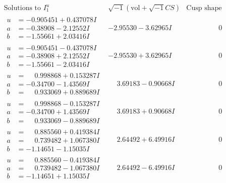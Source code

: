 \documentclass[1p]{elsarticle_modified}
\theoremstyle{definition}
\newcommand{\I}{\sqrt{-1}}
\begin{document}
$$\begin{array}{c|c|c}  
\text{Solutions to }I^u_{1}& \I (\text{vol} + \sqrt{-1}CS) & \text{Cusp shape}\\
 \hline 
\begin{aligned}
u &= -0.905451 + 0.437078 I \\
a &= -0.38908 - 2.12552 I \\
b &= -1.55661 + 2.03416 I\end{aligned}
 & -2.95530 - 3.62965 I & \phantom{-0.000000 } 0 \\ \hline\begin{aligned}
u &= -0.905451 - 0.437078 I \\
a &= -0.38908 + 2.12552 I \\
b &= -1.55661 - 2.03416 I\end{aligned}
 & -2.95530 + 3.62965 I & \phantom{-0.000000 } 0 \\ \hline\begin{aligned}
u &= \phantom{-}0.998868 + 0.153287 I \\
a &= -0.34700 - 1.43569 I \\
b &= \phantom{-}0.933069 + 0.889689 I\end{aligned}
 & \phantom{-}3.69183 - 0.90668 I & \phantom{-0.000000 } 0 \\ \hline\begin{aligned}
u &= \phantom{-}0.998868 - 0.153287 I \\
a &= -0.34700 + 1.43569 I \\
b &= \phantom{-}0.933069 - 0.889689 I\end{aligned}
 & \phantom{-}3.69183 + 0.90668 I & \phantom{-0.000000 } 0 \\ \hline\begin{aligned}
u &= \phantom{-}0.885560 + 0.419384 I \\
a &= \phantom{-}0.739482 + 1.067380 I \\
b &= -1.14651 - 1.15035 I\end{aligned}
 & \phantom{-}2.64492 + 6.49916 I & \phantom{-0.000000 } 0 \\ \hline\begin{aligned}
u &= \phantom{-}0.885560 - 0.419384 I \\
a &= \phantom{-}0.739482 - 1.067380 I \\
b &= -1.14651 + 1.15035 I\end{aligned}
 & \phantom{-}2.64492 - 6.49916 I & \phantom{-0.000000 } 0 \\ \hline\begin{aligned}

\end{aligned}
\end{array}$$
\end{document}
